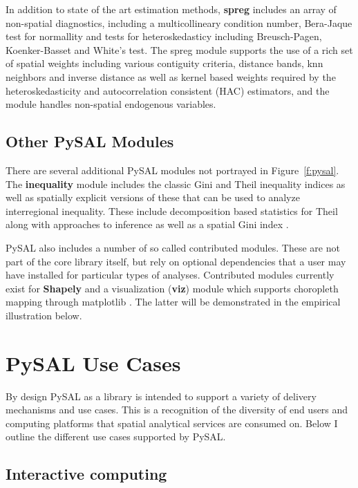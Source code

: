 \documentclass[11pt, titlepage]{amsart}
\begin{document}
In addition to state of the art estimation methods, \textbf{spreg} includes an
array of  non-spatial diagnostics, including a
multicollineary condition number, Bera-Jaque test for normallity and
tests for heteroskedasticy including Breusch-Pagen, Koenker-Basset and
White's test. The spreg module supports the use of a rich set of
spatial weights including various contiguity criteria, distance bands,
knn neighbors and inverse distance as well as kernel based weights
required by the heteroskedasticity and autocorrelation consistent (HAC)
estimators, and the module handles non-spatial endogenous variables.

\subsection{Other PySAL Modules}
There are several additional PySAL modules not portrayed in 
Figure~\ref{f:pysal}. The \textbf{inequality} module includes the classic Gini
and Theil inequality indices as well as spatially explicit versions of
these that can be used to analyze interregional inequality. These
include decomposition based statistics for Theil along with approaches
to inference \citep{Rey:2004ew}
as well as a spatial Gini index \citep{Rey:2012aa}.

PySAL also includes a number of so called contributed modules. These are
not part of the core library itself, but rely on optional dependencies
that a user may have installed for particular types of analyses.
Contributed modules currently exist for \textbf{Shapely}
\citep{Gillies:2008fr} and a visualization (\textbf{viz})
module which supports choropleth mapping through matplotlib
\citep{Hunter:2007cr}. The latter will be demonstrated in the empirical
illustration below.


\section{PySAL Use Cases}

By design PySAL as a library is intended to support a variety of
delivery mechanisms and use cases. This is a recognition of the
diversity of end users and computing platforms that spatial analytical
services are consumed on. Below I outline the different use cases
supported by PySAL.


\subsection{Interactive computing}
\end{document}
